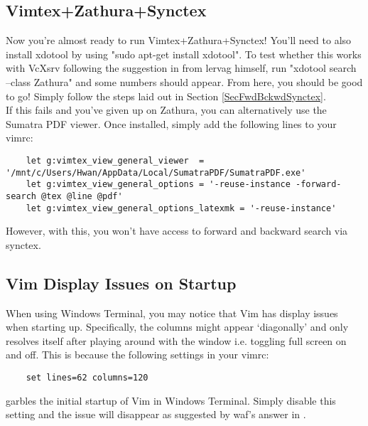 \subsection{Vimtex+Zathura+Synctex}
Now you're almost ready to run Vimtex+Zathura+Synctex! You'll need to also
install xdotool by using "sudo apt-get install xdotool". To test whether this
works with VcXsrv following the suggestion in \cite{paulrougieux2020vimtex} from
lervag himself, run "xdotool search --class Zathura" and some numbers should
appear. From here, you should be good to go! Simply follow the steps laid out in
Section \ref{SecFwdBckwdSynctex}.\\

If this fails and you've given up on Zathura, you can alternatively use the
Sumatra PDF viewer. Once installed, simply add the following lines to your
vimrc:
\begin{lstlisting}
    let g:vimtex_view_general_viewer  = '/mnt/c/Users/Hwan/AppData/Local/SumatraPDF/SumatraPDF.exe'
    let g:vimtex_view_general_options = '-reuse-instance -forward-search @tex @line @pdf'
    let g:vimtex_view_general_options_latexmk = '-reuse-instance'
\end{lstlisting}
However, with this, you won't have access to forward and backward search via
synctex.

\subsection{Vim Display Issues on Startup}
When using Windows Terminal, you may notice that Vim has display issues when
starting up. Specifically, the columns might appear `diagonally' and only
resolves itself after playing around with the window i.e. toggling full screen
on and off. This is because the following settings in your vimrc:
\begin{lstlisting}
    set lines=62 columns=120
\end{lstlisting}
garbles the initial startup of Vim in Windows Terminal. Simply disable this
setting and the issue will disappear as suggested by waf's answer in
\cite{tompounceonGit2020vim}.

